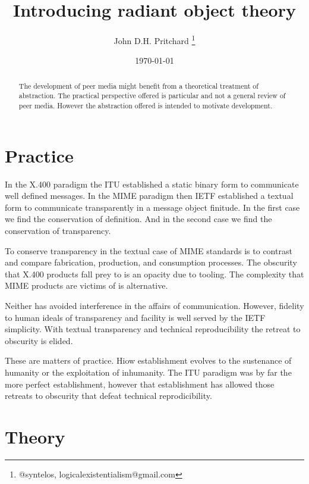 \documentclass[12pt,twocolumn]{article}
\begin{document}
\title{Introducing radiant object theory}

\author{John D.H. Pritchard \thanks{@syntelos, logicalexistentialism@gmail.com}}

\date{\today}

\maketitle


\begin{abstract}

The development of peer media might benefit from a theoretical
treatment of abstraction.  The practical perspective offered is
particular and not a general review of peer media.  However the
abstraction offered is intended to motivate development.
  
\end{abstract}


\section{Practice}

In the X.400 paradigm the ITU established a static binary form to
communicate well defined messages.  In the MIME paradigm then IETF
established a textual form to communicate transparently in a message
object finitude.  In the first case we find the conservation of
definition.  And in the second case we find the conservation of
transparency.  

To conserve transparency in the textual case of MIME standards is to
contrast and compare fabrication, production, and consumption
processes.  The obscurity that X.400 products fall prey to is an
opacity due to tooling.  The complexity that MIME products are victims
of is alternative.

Neither has avoided interference in the affairs of communication.
However, fidelity to human ideals of transparency and facility is well
served by the IETF simplicity.  With textual transparency and
technical reproducibility the retreat to obscurity is elided.

These are matters of practice.  Hiow establishment evolves to the
sustenance of humanity or the exploitation of inhumanity.  The ITU
paradigm was by far the more perfect establishment, however that
establishment has allowed those retreats to obscurity that defeat
technical reprodicibility.

\section{Theory}
\end{document}
